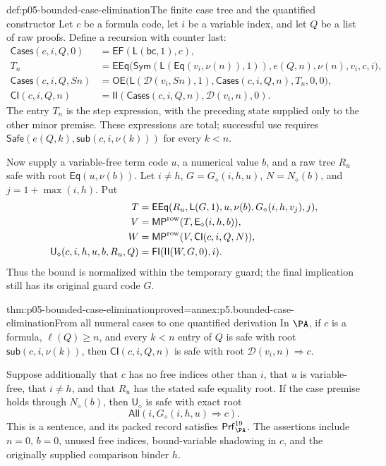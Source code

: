 \begin{hbdefinition}{def:p05-bounded-case-elimination}{The finite case tree and the quantified constructor}
Let \(c\) be a formula code, let \(i\) be a variable index, and let
\(Q\) be a list of raw proofs. Define a recursion with counter last:
\[
\begin{aligned}
 \mathsf{Cases}(c,i,Q,0)&=\mathsf{EF}(\mathsf L(\mathsf{bc},1),c),\\
 T_n&=\mathsf{EEq}\bigl(
       \mathsf{Sym}(\mathsf L(\mathsf{Eq}(v_i,\nu(n)),1)),e(Q,n),
                                      \nu(n),v_i,c,i\bigr),\\
 \mathsf{Cases}(c,i,Q,Sn)&=
   \mathsf{OE}\bigl(\mathsf L(\mathcal D(v_i,Sn),1),
                            \mathsf{Cases}(c,i,Q,n),T_n,0,0\bigr),\\
 \mathsf{CI}(c,i,Q,n)&=
   \mathsf{II}(\mathsf{Cases}(c,i,Q,n),\mathcal D(v_i,n),0).
\end{aligned}
\]
The entry \(T_n\) is the step expression, with the preceding state supplied
only to the other minor premise. These expressions are total; successful
use requires \(\mathsf{Safe}(e(Q,k),\mathsf{sub}(c,i,\nu(k)))\) for
every \(k<n\).

Now supply a variable-free term code \(u\), a numerical value \(b\),
and a raw tree \(R_u\) safe with root \(\mathsf{Eq}(u,\nu(b))\).
Let \(i\ne h\), \(G=G_\diamond(i,h,u)\),
\(N=N_\diamond(b)\), and \(j=1+\max(i,h)\). Put
\[
\begin{aligned}
 T&=\mathsf{EEq}(R_u,\mathsf L(G,1),u,\nu(b),G_\diamond(i,h,v_j),j),\\
 V&=\mathsf{MP}^{\rm row}
       (T,\mathsf E_\diamond(i,h,b)),\\
 W&=\mathsf{MP}^{\rm row}(V,\mathsf{CI}(c,i,Q,N)),\\
 \mathsf U_\diamond(c,i,h,u,b,R_u,Q)&=
                  \mathsf{FI}(\mathsf{II}(W,G,0),i).
\end{aligned}
\]
Thus the bound is normalized within the temporary guard; the final
implication still has its original guard code \(G\).
\end{hbdefinition}

\begin{hbtheorem}{thm:p05-bounded-case-elimination}{proved=annex:p5.bounded-case-elimination}{From all numeral cases to one quantified derivation}
In \(\PA\), if \(c\) is a formula, \(\ell(Q)\geq n\), and every
\(k<n\) entry of \(Q\) is safe with root
\(\mathsf{sub}(c,i,\nu(k))\), then
\(\mathsf{CI}(c,i,Q,n)\) is safe with root
\(\mathcal D(v_i,n)\Rightarrow c\).

Suppose additionally that \(c\) has no free indices other than \(i\),
that \(u\) is variable-free, that \(i\ne h\), and that \(R_u\)
has the stated safe equality root. If the case premise holds through
\(N_\diamond(b)\), then \(\mathsf U_\diamond\) is safe with exact root
\[
             \mathsf{All}(i,G_\diamond(i,h,u)\Rightarrow c).
\]
This is a sentence, and its packed record satisfies
\(\mathsf{Prf}^{19}_{\PA}\). The assertions include \(n=0\),
\(b=0\), unused free indices, bound-variable shadowing in \(c\), and
the originally supplied comparison binder \(h\).
\end{hbtheorem}

